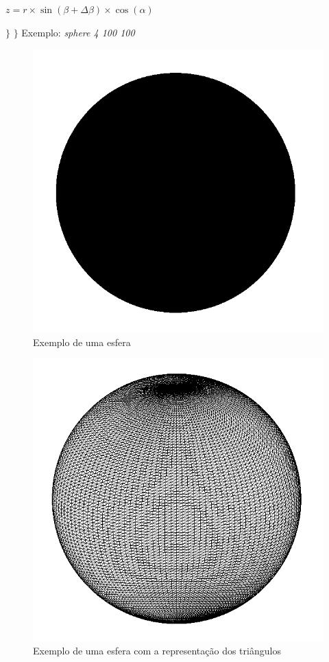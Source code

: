 \documentclass{article}
\begin{document}
\par$z = r\times\sin(\beta + \Delta\beta)\times\cos(\alpha)$ \newline
\par $\}$ \newline
$\}$
\newpage
Exemplo: \textit{sphere 4 100 100}
\begin{figure}[H]
\centering\includegraphics[scale=0.35]{esferaP} 
\caption{\label{fig:controller}Exemplo de uma esfera}
\end{figure} \begin{figure}[H]
\centering\includegraphics[scale=0.35]{esferaT} 
\caption{\label{fig:controller}Exemplo de uma esfera com a representação dos triângulos}
\end{figure}
\end{document}
